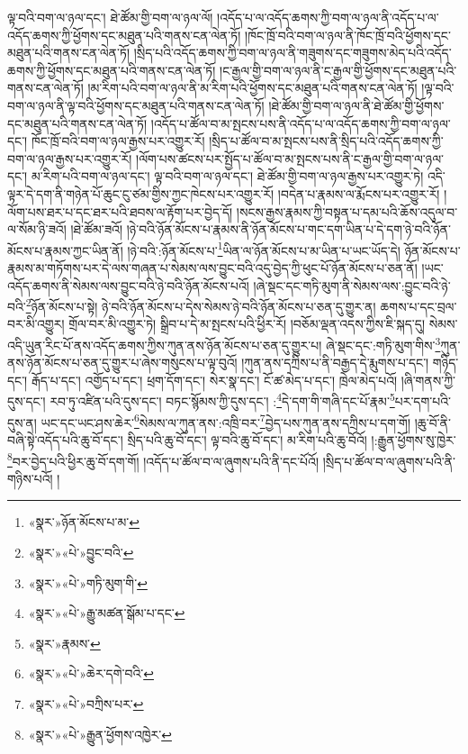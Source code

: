 ལྟ་བའི་བག་ལ་ཉལ་དང་། ཐེ་ཚོམ་གྱི་བག་ལ་ཉལ་ལོ། །འདོད་པ་ལ་འདོད་ཆགས་ཀྱི་བག་ལ་ཉལ་ནི་འདོད་པ་ལ་འདོད་ཆགས་ཀྱི་ཕྱོགས་དང་མཐུན་པའི་གནས་ངན་ལེན་ཏོ། །ཁོང་ཁྲོ་བའི་བག་ལ་ཉལ་ནི་ཁོང་ཁྲོ་བའི་ཕྱོགས་དང་མཐུན་པའི་གནས་ངན་ལེན་ཏོ། །སྲིད་པའི་འདོད་ཆགས་ཀྱི་བག་ལ་ཉལ་ནི་གཟུགས་དང་གཟུགས་མེད་པའི་འདོད་ཆགས་ཀྱི་ཕྱོགས་དང་མཐུན་པའི་གནས་ངན་ལེན་ཏོ། །ང་རྒྱལ་གྱི་བག་ལ་ཉལ་ནི་ང་རྒྱལ་གྱི་ཕྱོགས་དང་མཐུན་པའི་གནས་ངན་ལེན་ཏོ། །མ་རིག་པའི་བག་ལ་ཉལ་ནི་མ་རིག་པའི་ཕྱོགས་དང་མཐུན་པའི་གནས་ངན་ལེན་ཏོ། །ལྟ་བའི་བག་ལ་ཉལ་ནི་ལྟ་བའི་ཕྱོགས་དང་མཐུན་པའི་གནས་ངན་ལེན་ཏོ། །ཐེ་ཚོམ་གྱི་བག་ལ་ཉལ་ནི་ཐེ་ཚོམ་གྱི་ཕྱོགས་དང་མཐུན་པའི་གནས་ངན་ལེན་ཏོ། །འདོད་པ་ཚོལ་བ་མ་སྤངས་པས་ནི་འདོད་པ་ལ་འདོད་ཆགས་ཀྱི་བག་ལ་ཉལ་དང་། ཁོང་ཁྲོ་བའི་བག་ལ་ཉལ་རྒྱས་པར་འགྱུར་རོ། །སྲིད་པ་ཚོལ་བ་མ་སྤངས་པས་ནི་སྲིད་པའི་འདོད་ཆགས་ཀྱི་བག་ལ་ཉལ་རྒྱས་པར་འགྱུར་རོ། །ལོག་པས་ཚངས་པར་སྤྱོད་པ་ཚོལ་བ་མ་སྤངས་པས་ནི་ང་རྒྱལ་གྱི་བག་ལ་ཉལ་དང་། མ་རིག་པའི་བག་ལ་ཉལ་དང་། ལྟ་བའི་བག་ལ་ཉལ་དང་། ཐེ་ཚོམ་གྱི་བག་ལ་ཉལ་རྒྱས་པར་འགྱུར་ཏེ། འདི་ལྟར་དེ་དག་ནི་གཉེན་པོ་ཆུང་ངུ་ཙམ་གྱིས་ཀྱང་ཁེངས་པར་འགྱུར་རོ། །བདེན་པ་རྣམས་ལ་རྨོངས་པར་འགྱུར་རོ། །ལོག་པས་ཐར་པ་དང་ཐར་པའི་ཐབས་ལ་རྟོག་པར་བྱེད་དོ། །སངས་རྒྱས་རྣམས་ཀྱི་བསྟན་པ་དམ་པའི་ཆོས་འདུལ་བ་ལ་སོམ་ཉི་ཟའོ། །ཐེ་ཚོམ་ཟའོ། །ཉེ་བའི་ཉོན་མོངས་པ་རྣམས་ནི་ཉོན་མོངས་པ་གང་དག་ཡིན་པ་དེ་དག་ཉེ་བའི་ཉོན་མོངས་པ་རྣམས་ཀྱང་ཡིན་ནོ། །ཉེ་བའི་:ཉོན་མོངས་པ་\footnote{«སྣར་»ཉོན་མོངས་པ་མ་}ཡིན་ལ་ཉོན་མོངས་པ་མ་ཡིན་པ་ཡང་ཡོད་དེ། ཉོན་མོངས་པ་རྣམས་མ་གཏོགས་པར་དེ་ལས་གཞན་པ་སེམས་ལས་བྱུང་བའི་འདུ་བྱེད་ཀྱི་ཕུང་པོ་ཉོན་མོངས་པ་ཅན་ནོ། །ཡང་འདོད་ཆགས་ནི་སེམས་ལས་བྱུང་བའི་ཉེ་བའི་ཉོན་མོངས་པའོ། །ཞེ་སྡང་དང་གཏི་མུག་ནི་སེམས་ལས་:བྱུང་བའི་ཉེ་བའི་\footnote{«སྣར་»«པེ་»བྱུང་བའི་}ཉོན་མོངས་པ་སྟེ། ཉེ་བའི་ཉོན་མོངས་པ་དེས་སེམས་ཉེ་བའི་ཉོན་མོངས་པ་ཅན་དུ་གྱུར་ན། ཆགས་པ་དང་བྲལ་བར་མི་འགྱུར། གྲོལ་བར་མི་འགྱུར་ཏེ། སྒྲིབ་པ་དེ་མ་སྤངས་པའི་ཕྱིར་རོ། །བཅོམ་ལྡན་འདས་ཀྱིས་ཇི་སྐད་དུ། སེམས་འདི་ཡུན་རིང་པོ་ནས་འདོད་ཆགས་ཀྱིས་ཀུན་ནས་ཉོན་མོངས་པ་ཅན་དུ་གྱུར་པ། ཞེ་སྡང་དང་:གཏི་མུག་གིས་\footnote{«སྣར་»«པེ་»གཏི་མུག་གི་}ཀུན་ནས་ཉོན་མོངས་པ་ཅན་དུ་གྱུར་པ་ཞེས་གསུངས་པ་ལྟ་བུའོ། །ཀུན་ནས་དཀྲིས་པ་ནི་བརྒྱད་དེ་རྨུགས་པ་དང་། གཉིད་དང་། རྒོད་པ་དང་། འགྱོད་པ་དང་། ཕྲག་དོག་དང་། སེར་སྣ་དང་། ངོ་ཚ་མེད་པ་དང་། ཁྲེལ་མེད་པའོ། །ཞི་གནས་ཀྱི་དུས་དང་། རབ་ཏུ་འཛིན་པའི་དུས་དང་། བཏང་སྙོམས་ཀྱི་དུས་དང་། :\footnote{«སྣར་»«པེ་»རྒྱུ་མཚན་སྒོམ་པ་དང་}དེ་དག་གི་གཞི་དང་པོ་རྣམ་\footnote{«སྣར་»རྣམས་}པར་དག་པའི་དུས་ན། ཡང་དང་ཡང་ཤས་ཆེར་\footnote{«སྣར་»«པེ་»ཆེར་དགེ་བའི་}སེམས་ལ་ཀུན་ནས་:འཁྲི་བར་\footnote{«སྣར་»«པེ་»བཀྲིས་པར་}བྱེད་པས་ཀུན་ནས་དཀྲིས་པ་དག་གོ། །ཆུ་བོ་ནི་བཞི་སྟེ་འདོད་པའི་ཆུ་བོ་དང་། སྲིད་པའི་ཆུ་བོ་དང་། ལྟ་བའི་ཆུ་བོ་དང་། མ་རིག་པའི་ཆུ་བོའོ། །:རྒྱུན་ཕྱོགས་སུ་ཁྱེར་\footnote{«སྣར་»«པེ་»རྒྱུན་ཕྱོགས་འཁྱེར་}བར་བྱེད་པའི་ཕྱིར་ཆུ་བོ་དག་གོ། །འདོད་པ་ཚོལ་བ་ལ་ཞུགས་པའི་ནི་དང་པོའོ། །སྲིད་པ་ཚོལ་བ་ལ་ཞུགས་པའི་ནི་གཉིས་པའོ། །

